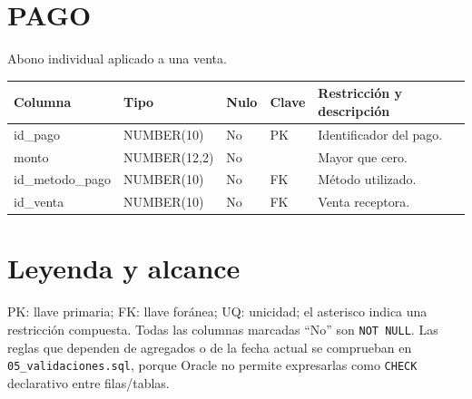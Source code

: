 \documentclass[9pt,letterpaper]{article}
\newcommand{\tabla}[2]{\section{#1}\textcolor{muted}{#2}\par\smallskip}
\newenvironment{dic}{\begin{longtable}{>{\ttfamily}p{2.8cm}p{2.3cm}p{1.1cm}p{1.5cm}p{7.3cm}}\toprule Columna & Tipo & Nulo & Clave & Restricción y descripción\\\midrule\endhead}{\end{longtable}}
\begin{document}
\tabla{PAGO}{Abono individual aplicado a una venta.}
\begin{dic}id\_pago&NUMBER(10)&No&PK&Identificador del pago.\\monto&NUMBER(12,2)&No&&Mayor que cero.\\id\_metodo\_pago&NUMBER(10)&No&FK&Método utilizado.\\id\_venta&NUMBER(10)&No&FK&Venta receptora.\end{dic}

\section*{Leyenda y alcance}
PK: llave primaria; FK: llave foránea; UQ: unicidad; el asterisco indica una restricción compuesta. Todas las columnas marcadas ``No'' son \texttt{NOT NULL}. Las reglas que dependen de agregados o de la fecha actual se comprueban en \texttt{05\_validaciones.sql}, porque Oracle no permite expresarlas como \texttt{CHECK} declarativo entre filas/tablas.
\end{document}
